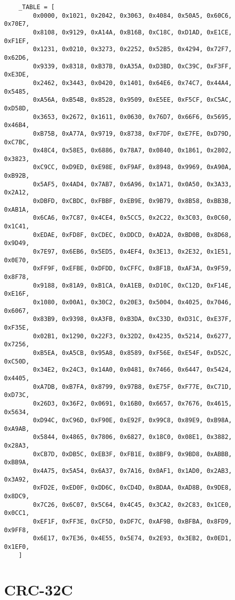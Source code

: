 \begin{samepage}
\begin{verbatim}
    _TABLE = [
        0x0000, 0x1021, 0x2042, 0x3063, 0x4084, 0x50A5, 0x60C6, 0x70E7,
        0x8108, 0x9129, 0xA14A, 0xB16B, 0xC18C, 0xD1AD, 0xE1CE, 0xF1EF,
        0x1231, 0x0210, 0x3273, 0x2252, 0x52B5, 0x4294, 0x72F7, 0x62D6,
        0x9339, 0x8318, 0xB37B, 0xA35A, 0xD3BD, 0xC39C, 0xF3FF, 0xE3DE,
        0x2462, 0x3443, 0x0420, 0x1401, 0x64E6, 0x74C7, 0x44A4, 0x5485,
        0xA56A, 0xB54B, 0x8528, 0x9509, 0xE5EE, 0xF5CF, 0xC5AC, 0xD58D,
        0x3653, 0x2672, 0x1611, 0x0630, 0x76D7, 0x66F6, 0x5695, 0x46B4,
        0xB75B, 0xA77A, 0x9719, 0x8738, 0xF7DF, 0xE7FE, 0xD79D, 0xC7BC,
        0x48C4, 0x58E5, 0x6886, 0x78A7, 0x0840, 0x1861, 0x2802, 0x3823,
        0xC9CC, 0xD9ED, 0xE98E, 0xF9AF, 0x8948, 0x9969, 0xA90A, 0xB92B,
        0x5AF5, 0x4AD4, 0x7AB7, 0x6A96, 0x1A71, 0x0A50, 0x3A33, 0x2A12,
        0xDBFD, 0xCBDC, 0xFBBF, 0xEB9E, 0x9B79, 0x8B58, 0xBB3B, 0xAB1A,
        0x6CA6, 0x7C87, 0x4CE4, 0x5CC5, 0x2C22, 0x3C03, 0x0C60, 0x1C41,
        0xEDAE, 0xFD8F, 0xCDEC, 0xDDCD, 0xAD2A, 0xBD0B, 0x8D68, 0x9D49,
        0x7E97, 0x6EB6, 0x5ED5, 0x4EF4, 0x3E13, 0x2E32, 0x1E51, 0x0E70,
        0xFF9F, 0xEFBE, 0xDFDD, 0xCFFC, 0xBF1B, 0xAF3A, 0x9F59, 0x8F78,
        0x9188, 0x81A9, 0xB1CA, 0xA1EB, 0xD10C, 0xC12D, 0xF14E, 0xE16F,
        0x1080, 0x00A1, 0x30C2, 0x20E3, 0x5004, 0x4025, 0x7046, 0x6067,
        0x83B9, 0x9398, 0xA3FB, 0xB3DA, 0xC33D, 0xD31C, 0xE37F, 0xF35E,
        0x02B1, 0x1290, 0x22F3, 0x32D2, 0x4235, 0x5214, 0x6277, 0x7256,
        0xB5EA, 0xA5CB, 0x95A8, 0x8589, 0xF56E, 0xE54F, 0xD52C, 0xC50D,
        0x34E2, 0x24C3, 0x14A0, 0x0481, 0x7466, 0x6447, 0x5424, 0x4405,
        0xA7DB, 0xB7FA, 0x8799, 0x97B8, 0xE75F, 0xF77E, 0xC71D, 0xD73C,
        0x26D3, 0x36F2, 0x0691, 0x16B0, 0x6657, 0x7676, 0x4615, 0x5634,
        0xD94C, 0xC96D, 0xF90E, 0xE92F, 0x99C8, 0x89E9, 0xB98A, 0xA9AB,
        0x5844, 0x4865, 0x7806, 0x6827, 0x18C0, 0x08E1, 0x3882, 0x28A3,
        0xCB7D, 0xDB5C, 0xEB3F, 0xFB1E, 0x8BF9, 0x9BD8, 0xABBB, 0xBB9A,
        0x4A75, 0x5A54, 0x6A37, 0x7A16, 0x0AF1, 0x1AD0, 0x2AB3, 0x3A92,
        0xFD2E, 0xED0F, 0xDD6C, 0xCD4D, 0xBDAA, 0xAD8B, 0x9DE8, 0x8DC9,
        0x7C26, 0x6C07, 0x5C64, 0x4C45, 0x3CA2, 0x2C83, 0x1CE0, 0x0CC1,
        0xEF1F, 0xFF3E, 0xCF5D, 0xDF7C, 0xAF9B, 0xBFBA, 0x8FD9, 0x9FF8,
        0x6E17, 0x7E36, 0x4E55, 0x5E74, 0x2E93, 0x3EB2, 0x0ED1, 0x1EF0,
    ]
\end{verbatim}
\end{samepage}

\newpage
\section{CRC-32C}\label{sec:appendix_crc32c}

